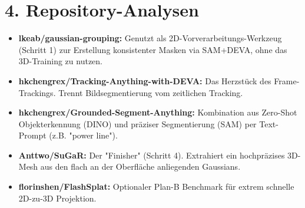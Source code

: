 \documentclass[11pt, a4paper]{article}
\begin{document}
\section{4. Repository-Analysen}

\begin{itemize}
    \item \textbf{lkeab/gaussian-grouping:} Genutzt als 2D-Vorverarbeitungs-Werkzeug (Schritt 1) zur Erstellung konsistenter Masken via SAM+DEVA, ohne das 3D-Training zu nutzen.
    \item \textbf{hkchengrex/Tracking-Anything-with-DEVA:} Das Herzst\"uck des Frame-Trackings. Trennt Bildsegmentierung vom zeitlichen Tracking.
    \item \textbf{hkchengrex/Grounded-Segment-Anything:} Kombination aus Zero-Shot Objekterkennung (DINO) und präziser Segmentierung (SAM) per Text-Prompt (z.B. "power line").
    \item \textbf{Anttwo/SuGaR:} Der "Finisher" (Schritt 4). Extrahiert ein hochpr\"azises 3D-Mesh aus den flach an der Oberfl\"ache anliegenden Gaussians.
    \item \textbf{florinshen/FlashSplat:} Optionaler Plan-B Benchmark f\"ur extrem schnelle 2D-zu-3D Projektion.
\end{itemize}
\end{document}
